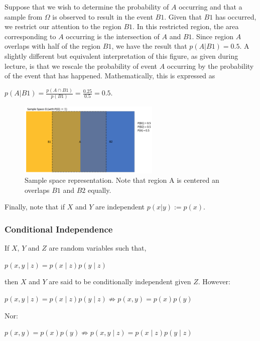 \documentclass[twoside]{article}
\begin{document}
Suppose that we wish to determine the probability of $A$ occurring and that a sample from $\Omega$ is observed to result in the event $B1$. Given that $B1$ has occurred, we restrict our attention to the region $B1$. In this restricted region, the area corresponding to $A$ occurring is the intersection of $A$ and $B1$. Since region $A$ overlaps with half of the region $B1$, we have the result that $p(A|B1) = 0.5.$ A slightly different but equivalent interpretation of this figure, as given during lecture, is that we rescale the probability of event $A$ occurring by the probability of the event that has happened. Mathematically, this is expressed as

\begin{center}
$p(A|B1)=\frac{p(A \cap B1)}{p(B1)}=\frac{0.25}{0.5}=0.5.$
\end{center}

\begin{figure}[h!]
	\centering
    \includegraphics[width=0.6\textwidth]{img/Cond_Prob_Example.png}
    \caption{Sample space representation. Note that region A is centered an overlaps $B1$ and $B2$ equally.}
    \label{fig:cond_prob_example}
\end{figure}

Finally, note that if $X$ and $Y$ are independent $p(x|y):=p(x)$.
\subsubsection{Conditional Independence}
If $X$, $Y$ and $Z$ are random variables such that, 
\begin{center}
$p(x,y \mid z)=p(x \mid z)p(y \mid z)$
\end{center}
then $X$ and $Y$ are said to be conditionally independent given $Z$. \newline
However:
\begin{center}
$p(x,y \mid z)=p(x \mid z)p(y \mid z) \not \Rightarrow p(x,y)=p(x)p(y)$
\end{center}
Nor:
\begin{center}
$p(x,y)=p(x)p(y) \not \Rightarrow p(x,y \mid z)=p(x \mid z)p(y \mid z)$
\end{center}
\end{document}
